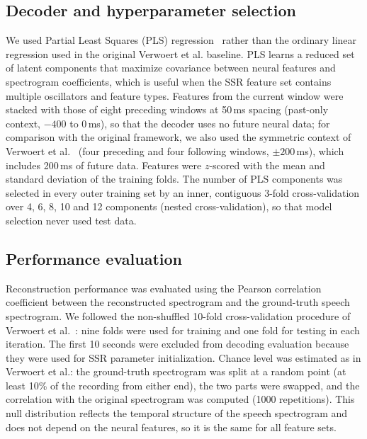 \documentclass{iopjournal}
\begin{document}
\subsection{Decoder and hyperparameter selection}

We used Partial Least Squares (PLS) regression~\cite{Wold2001} rather than the ordinary linear regression used in the original Verwoert et al. baseline. PLS learns a reduced set of latent components that maximize covariance between neural features and spectrogram coefficients, which is useful when the SSR feature set contains multiple oscillators and feature types. Features from the current window were stacked with those of eight preceding windows at 50\,ms spacing (past-only context, $-400$ to $0$\,ms), so that the decoder uses no future neural data; for comparison with the original framework, we also used the symmetric context of Verwoert et al.~\cite{dataset} (four preceding and four following windows, $\pm200$\,ms), which includes 200\,ms of future data. Features were $z$-scored with the mean and standard deviation of the training folds. The number of PLS components was selected in every outer training set by an inner, contiguous 3-fold cross-validation over 4, 6, 8, 10 and 12 components (nested cross-validation), so that model selection never used test data.

\subsection{Performance evaluation}

Reconstruction performance was evaluated using the Pearson correlation coefficient between the reconstructed spectrogram and the ground-truth speech spectrogram. We followed the non-shuffled 10-fold cross-validation procedure of Verwoert et al.~\cite{dataset}: nine folds were used for training and one fold for testing in each iteration. The first 10 seconds were excluded from decoding evaluation because they were used for SSR parameter initialization. Chance level was estimated as in Verwoert et al.: the ground-truth spectrogram was split at a random point (at least 10\% of the recording from either end), the two parts were swapped, and the correlation with the original spectrogram was computed (1000 repetitions). This null distribution reflects the temporal structure of the speech spectrogram and does not depend on the neural features, so it is the same for all feature sets.
\end{document}
